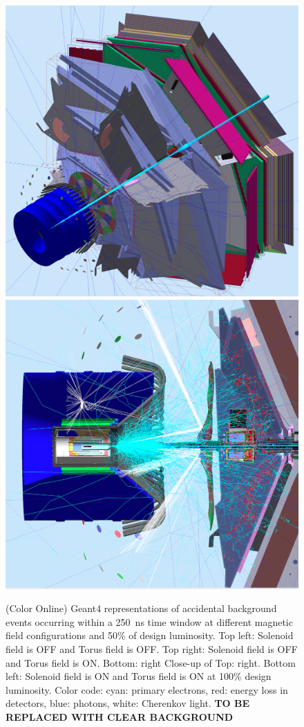 \documentclass[final,3p,twocolumn]{elsarticle}
\begin{document}
\begin{figure}[htbp!]
\centerline{\includegraphics[width=1.0\columnwidth]{100percentSolenoid.png}
\includegraphics[width=1.0\columnwidth]{50percentNoSolenoidCut3a.png}}
\caption{(Color Online) Geant4 representations of accidental background events occurring within a 250~ns time window at different
magnetic field configurations and 50\% of design luminosity. Top left: Solenoid field is OFF and Torus field is OFF. Top
right: Solenoid field is OFF and Torus field is ON. Bottom: right Close-up of Top: right.  Bottom left: Solenoid field is ON
and Torus field is ON at 100\% design luminosity. Color code: cyan: primary electrons, red: energy loss in detectors, blue:
photons, white: Cherenkov light. {\bf TO BE REPLACED WITH CLEAR BACKGROUND } }
\label{gemc-event}
\end{figure}
\end{document}
